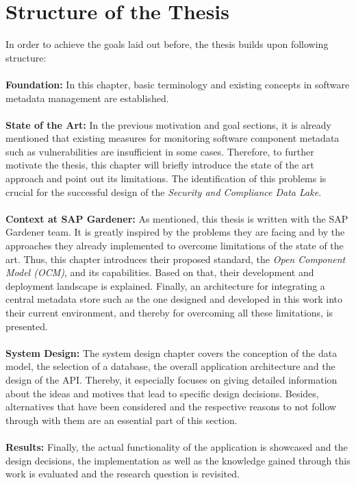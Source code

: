 \section{Structure of the Thesis}
In order to achieve the goals laid out before, the thesis builds upon following structure:\\\\
\textbf{Foundation:} In this chapter, basic terminology and existing concepts in software metadata management are established.\\\\
\textbf{State of the Art:} In the previous motivation and goal sections, it is already mentioned that existing measures for monitoring software component metadata such as vulnerabilities are insufficient in some cases. Therefore, to further motivate the thesis, this chapter will briefly introduce the state of the art approach and point out its limitations. The identification of this problems is crucial for the successful design of the \emph{Security and Compliance Data Lake}.\\\\
\textbf{Context at SAP Gardener:} As mentioned, this thesis is written with the SAP Gardener team. It is greatly inspired by the problems they are facing and by the approaches they already implemented to overcome limitations of the state of the art. Thus, this chapter introduces their proposed standard, the \emph{Open Component Model (OCM)}, and its capabilities. Based on that, their development and deployment landscape is explained. Finally, an architecture for integrating a central metadata store such as the one designed and developed in this work into their current environment, and thereby for overcoming all these limitations, is presented.\\\\
\textbf{System Design:} The system design chapter covers the conception of the data model, the selection of a database, the overall application architecture and the design of the API. Thereby, it especially focuses on giving detailed information about the ideas and motives that lead to specific design decisions. Besides, alternatives that have been considered and the respective reasons to not follow through with them are an essential part of this section.\\\\
\textbf{Results:} Finally, the actual functionality of the application is showcased and the design decisions, the implementation as well as the knowledge gained through this work is evaluated and the research question is revisited.


